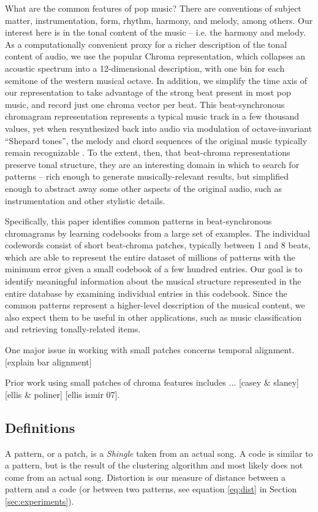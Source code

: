 \documentclass{article}
\begin{document}
What are the common features of pop music?  There are conventions
of subject matter, instrumentation, form, rhythm, harmony, and melody, among
others.  Our interest here is in the tonal content of the music -- i.e. the
harmony and melody.  As a computationally convenient proxy for a richer
description of the tonal content of audio, we use the popular Chroma
representation, which collapses an acoustic spectrum into a 12-dimensional
description, with one bin for each semitone of the western musical octave.
In addition, we simplify the time axis of our representation to take advantage
of the strong beat present in most pop music, and record just one
chroma vector per beat.  This beat-synchronous chromagram
representation represents a typical music track
in a few thousand values, yet when resynthesized back into audio via
modulation of octave-invariant ``Shepard tones'', the melody and
chord sequences of the original music typically remain recognizable
\cite{EllisPoliner-icassp07}.  To the extent, then, that beat-chroma
representations preserve tonal structure, they
are an interesting domain in which to search for patterns -- rich enough
to generate musically-relevant results, but simplified enough to
abstract away some other aspects of the original audio, such as
instrumentation and other stylistic details.

Specifically, this paper identifies common patterns in beat-synchronous
chromagrams by learning codebooks from a large set of examples.
The individual codewords consist of short beat-chroma patches, typically
between 1 and 8 beats, which are able to represent the entire dataset
of millions of patterns with the minimum error given a small codebook of
a few hundred entries.  Our goal is to identify meaningful information
about the musical structure represented in the entire database by
examining individual entries in this codebook.  Since the common
patterns represent a higher-level description of the musical content,
we also expect them to be useful in other applications, such as
music classification and retrieving tonally-related items.

One major issue in working with small patches concerns temporal
alignment.  [explain bar alignment]

Prior work using small patches of chroma features includes ...
[casey \& slaney] [ellis \& poliner] [ellis ismir 07].


\subsection{Definitions}
A pattern, or a patch, is a \textit{Shingle} taken from an actual song.
A code is similar to a pattern, but is the result of the clustering
algorithm and most likely does not come from an actual song.
Distortion is our measure of distance between a pattern and a code
(or between two patterns, see equation \ref{eq:dist} in Section 
\ref{sec:experiments}).
\end{document}

